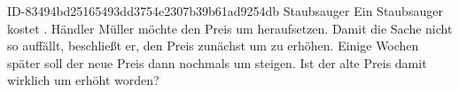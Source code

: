 \begin{exercise}
      {ID-83494bd25165493dd3754e2307b39b61ad9254db}
      {Staubsauger}
  \ifproblem\problem
    Ein Staubsauger kostet . Händler Müller möchte den Preis um 
    heraufsetzen. Damit die Sache nicht so auffällt, beschließt er, den Preis
    zunächst um  zu erhöhen. Einige Wochen später soll der neue Preis
    dann nochmals um  steigen. Ist der alte Preis damit wirklich um
     erhöht worden?
  \fi
\end{exercise}
